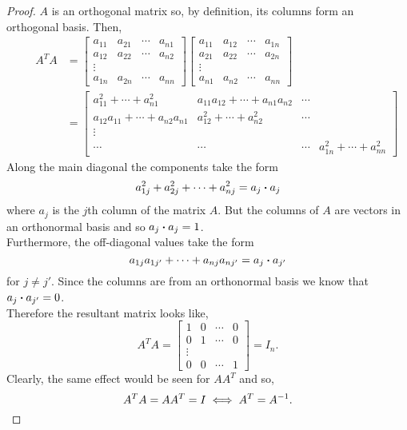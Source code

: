 \documentclass[../MathsNotesBase.tex]{subfiles}
\begin{document}
{		\medskip
		\begin{proof}
			$A$ is an orthogonal matrix so, by definition, its columns form an orthogonal basis. Then,
			\begin{align*}
			&& A^TA &=
					\begin{bmatrix}
						a_{11} & a_{21} & \cdots & a_{n1}\\
						a_{12} & a_{22} & \cdots & a_{n2}\\
						\vdots \\
						a_{1n} & a_{2n} & \cdots & a_{nn}
					\end{bmatrix}
					\begin{bmatrix}
						a_{11} & a_{12} & \cdots & a_{1n}\\
						a_{21} & a_{22} & \cdots & a_{2n}\\
						\vdots \\
						a_{n1} & a_{n2} & \cdots & a_{nn}
					\end{bmatrix} \\
			&&  &= \begin{bmatrix}
						a_{11}^2 + \cdots + a_{n1}^2 & a_{11}a_{12} + \cdots + a_{n1}a_{n2} & \cdots\\
						a_{12}a_{11} + \cdots + a_{n2}a_{n1} & a_{12}^2 + \cdots + a_{n2}^2 & \cdots\\
						\vdots \\
						\cdots & \cdots & \cdots & a_{1n}^2 + \cdots + a_{nn}^2
					\end{bmatrix}
			\end{align*}
			Along the main diagonal the components take the form
			\[ a_{1j}^2 + a_{2j}^2 + \cdots + a_{nj}^2 = a_j \boldsymbol{\cdot} a_j \]
			where ${ a_j }$ is the $j$th column of the matrix $A$. But the columns of $A$ are vectors in an orthonormal basis and so ${ a_j \boldsymbol{\cdot} a_j= 1 }$.\\
			Furthermore, the off-diagonal values take the form
			\[ a_{1j}a_{1j'} + \cdots + a_{nj}a_{nj'} = a_j \boldsymbol{\cdot} a_{j'} \]
			for ${ j \neq j' }$. Since the columns are from an orthonormal basis we know that ${ a_j \boldsymbol{\cdot} a_{j'} = 0 }$.\\
			Therefore the resultant matrix looks like,
			\[ A^TA = \begin{bmatrix}
						1 & 0 & \cdots & 0\\
						0 & 1 & \cdots & 0\\
						\vdots\\
						0 & 0 & \cdots & 1
					  \end{bmatrix}
					  = I_n.
			\]
			Clearly, the same effect would be seen for ${ AA^T }$ and so,
			\[ A^TA = AA^T = I \iff A^T = {A}^{-1}. \qedhere \]
		\end{proof}
	
}
\end{document}
